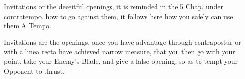 

Invitations or the deceitful openings, it is reminded in the 5 Chap. under
contratempo, how to go against them, it follows here how you safely
can use them A Tempo.


Invitations are the openings, once you have advantage through contrapostur
or with a linea recta have achieved narrow measure, that you then go
with your point, take your Enemy's Blade, and give a false opening, so
as to tempt your Opponent to thrust.
